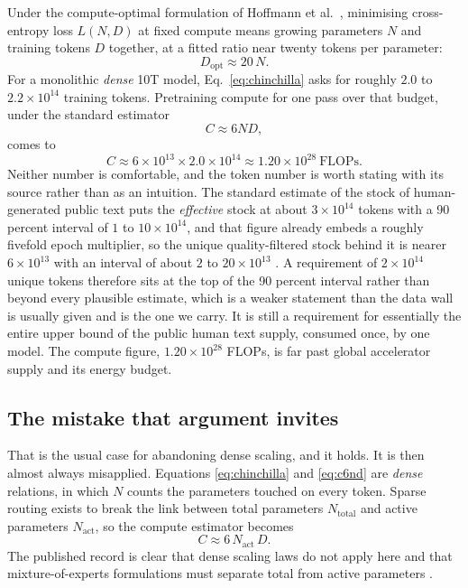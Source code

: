 \documentclass[11pt]{article}
\begin{document}
Under the compute-optimal formulation of Hoffmann et al.\ \cite{hoffmann2022}, minimising cross-entropy loss $L(N,D)$ at fixed compute means growing parameters $N$ and training tokens $D$ together, at a fitted ratio near twenty tokens per parameter:
\begin{equation}
D_{\mathrm{opt}} \approx 20\,N .
\label{eq:chinchilla}
\end{equation}
For a monolithic \emph{dense} 10T model, Eq.~\eqref{eq:chinchilla} asks for roughly $2.0$ to $2.2 \times 10^{14}$ training tokens. Pretraining compute for one pass over that budget, under the standard estimator
\begin{equation}
C \approx 6 N D ,
\label{eq:c6nd}
\end{equation}
comes to
\[
C \approx 6 \times 10^{13} \times 2.0\times 10^{14} \approx 1.20\times 10^{28}\ \text{FLOPs}.
\]
Neither number is comfortable, and the token number is worth stating with its source rather than as an intuition. The standard estimate of the stock of human-generated public text puts the \emph{effective} stock at about $3\times10^{14}$ tokens with a 90 percent interval of $1$ to $10\times10^{14}$, and that figure already embeds a roughly fivefold epoch multiplier, so the unique quality-filtered stock behind it is nearer $6\times10^{13}$ with an interval of about $2$ to $20\times10^{13}$ \cite{villalobos2024data}. A requirement of $2\times10^{14}$ unique tokens therefore sits at the top of the 90 percent interval rather than beyond every plausible estimate, which is a weaker statement than the data wall is usually given and is the one we carry. It is still a requirement for essentially the entire upper bound of the public human text supply, consumed once, by one model. The compute figure, $1.20\times10^{28}$ FLOPs, is far past global accelerator supply and its energy budget.

\subsection{The mistake that argument invites}
\label{sec:categoryerror}

That is the usual case for abandoning dense scaling, and it holds. It is then almost always misapplied. Equations \eqref{eq:chinchilla} and \eqref{eq:c6nd} are \emph{dense} relations, in which $N$ counts the parameters touched on every token. Sparse routing exists to break the link between total parameters $N_{\mathrm{total}}$ and active parameters $N_{\mathrm{act}}$, so the compute estimator becomes
\begin{equation}
C \approx 6\, N_{\mathrm{act}}\, D .
\label{eq:c6nactd}
\end{equation}
The published record is clear that dense scaling laws do not apply here and that mixture-of-experts formulations must separate total from active parameters \cite{ludziejewski2025,moescaling2026}.
\end{document}
